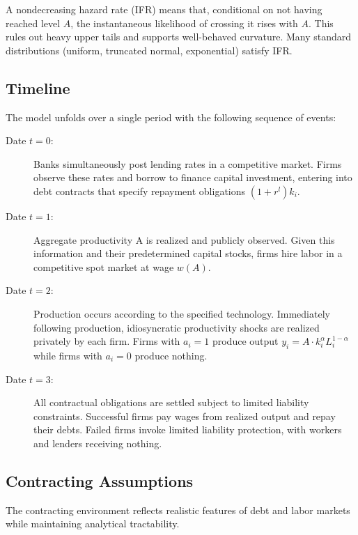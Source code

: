 \documentclass[12pt]{article}
\begin{document}
\begin{remark}
A nondecreasing hazard rate (IFR) means that, conditional on not having reached level $A$, the instantaneous likelihood of crossing it rises with $A$. This rules out heavy upper tails and supports well-behaved curvature. Many standard distributions (uniform, truncated normal, exponential) satisfy IFR.
\end{remark}

\subsection{Timeline}
The model unfolds over a single period with the following sequence of events:
\begin{description}
    \item[Date $t=0$:] Banks simultaneously post lending rates in a competitive market. Firms observe these rates and borrow to finance capital investment, entering into debt contracts that specify repayment obligations $(1+r^{l})k_{i}$.
    \item[Date $t=1$:] Aggregate productivity A is realized and publicly observed. Given this information and their predetermined capital stocks, firms hire labor in a competitive spot market at wage $w(A)$.
    \item[Date $t=2$:] Production occurs according to the specified technology. Immediately following production, idiosyncratic productivity shocks are realized privately by each firm. Firms with $a_{i}=1$ produce output $y_{i}=A \cdot k_{i}^{\alpha}L_{i}^{1-\alpha}$ while firms with $a_{i}=0$ produce nothing.
    \item[Date $t=3$:] All contractual obligations are settled subject to limited liability constraints. Successful firms pay wages from realized output and repay their debts. Failed firms invoke limited liability protection, with workers and lenders receiving nothing.
\end{description}

\subsection{Contracting Assumptions}
The contracting environment reflects realistic features of debt and labor markets while maintaining analytical tractability.
\end{document}
